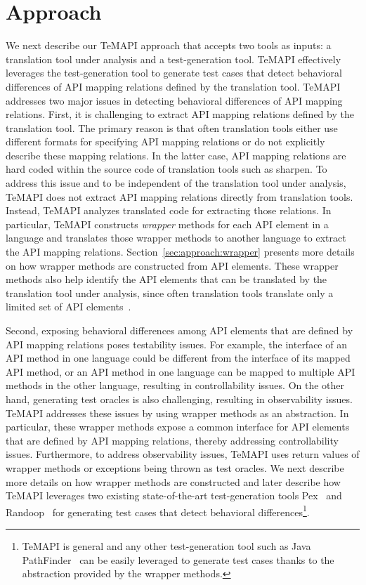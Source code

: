 \section{Approach}
\label{sec:approach}

We next describe our TeMAPI approach that accepts two tools as inputs: a translation tool under analysis and a test-generation tool. TeMAPI effectively leverages the test-generation tool to generate test cases that detect behavioral differences of API mapping relations defined by the translation tool. TeMAPI addresses two major issues in detecting behavioral differences of API mapping relations. First, it is challenging to extract API mapping relations defined by the translation tool. The primary reason is that often translation tools either use different formats for specifying API mapping relations or do not explicitly describe these mapping relations. In the latter case, API mapping relations are hard coded within the source code of translation tools such as sharpen. To address this issue and to be independent of the translation tool under analysis, TeMAPI does not extract API mapping relations directly from translation tools. Instead, TeMAPI analyzes translated code for extracting those relations. In particular, TeMAPI constructs \emph{wrapper} methods for each API element in a language and translates those wrapper methods to another language to extract the API mapping relations. Section~\ref{sec:approach:wrapper} presents more details on how wrapper methods are constructed from API elements. These wrapper methods also help identify the API elements that can be translated by the translation tool under analysis, since often translation tools translate only a limited set of API elements~\cite{zhong2010mining}.

Second, exposing behavioral differences among API elements that are defined by API mapping relations poses testability issues. For example, the interface of an API method in one language could be different from the interface of its mapped API method, or an API method in one language can be mapped to multiple API methods in the other language, resulting in controllability issues. On the other hand, generating test oracles is also challenging, resulting in observability issues. TeMAPI addresses these issues by using wrapper methods as an abstraction. In particular, these wrapper methods expose a common interface for API elements that are defined by API mapping relations, thereby addressing controllability issues. Furthermore, to address observability issues, TeMAPI uses return values of wrapper methods or exceptions being thrown as test oracles. We next describe more details on how wrapper methods are constructed and later describe how TeMAPI leverages two existing state-of-the-art test-generation tools Pex~\cite{tillmann2008pex} and Randoop~\cite{pacheco2007feedback} for generating test cases that detect behavioral differences\footnote{TeMAPI is general and any other test-generation tool such as Java PathFinder~\cite{DBLP:conf/tacas/AnandPV07} can be easily leveraged to generate test cases thanks to the abstraction provided by the wrapper methods.}.

